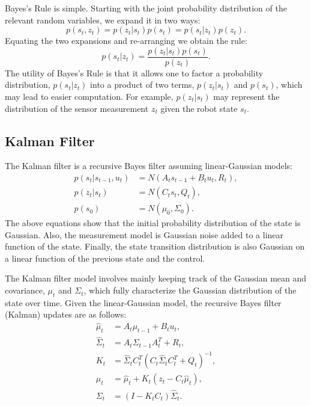 \documentclass{article}
\begin{document}
Bayes's Rule is simple.  Starting with the joint probability distribution of the relevant random variables, we expand it in two ways:
\begin{equation}
p(s_t , z_t) = p(z_t | s_t) p(s_t) = p(s_t | z_t) p(z_t).
\end{equation}
Equating the two expansions and re-arranging we obtain the rule:
\begin{equation}
p(s_t | z_t) = \frac{p(z_t | s_t) p(s_t)}{p(z_t)}.
\end{equation}
The utility of Bayes's Rule is that it allows one to factor a probability distribution, $p(s_t | z_t)$ into a product of two terms, $p(z_t | s_t)$ and $p(s_t)$, which may lead to easier computation.  For example, $p(z_t | s_t)$ may represent the distribution of the sensor measurement $z_t$ given the robot state $s_t$.

\subsection{Kalman Filter} \label{sec:kalman}

The Kalman filter is a recursive Bayes filter assuming linear-Gaussian models:
\begin{align}
p(s_t | s_{t-1}, u_t) &= N(A_t s_{t-1} + B_t u_t, R_t), \\
p(z_t | s_t) &= N(C_t s_t,  Q_t), \\
p(s_0) &= N(\mu_0, \Sigma_0).
\end{align}
The above equations show that the initial probability distribution of the state is Gaussian.  Also, the measurement model is Gaussian noise added to a linear function of the state.  Finally, the state transition distribution is also Gaussian on a linear function of the previous state and the control.

The Kalman filter model involves mainly keeping track of the Gaussian mean and covariance, $\mu_t$ and $\Sigma_t$, which fully characterize the Gaussian distribution of the state over time.  Given the linear-Gaussian model, the recursive Bayes filter (Kalman) updates are as follows:
\begin{align}
\hat{\mu}_t &= A_t \mu_{t-1} + B_t u_t, \\
\hat{\Sigma}_t &= A_t \Sigma_{t-1} A_t^T + R_t, \\
K_t &= \hat{\Sigma}_t C_t^T (C_t \hat{\Sigma}_t C_t^T + Q_t)^{-1}, \\
\mu_t &= \hat{\mu}_t + K_t (z_t - C_t \hat{\mu}_t), \\
\Sigma_t &= (I - K_t C_t) \hat{\Sigma}_t.
\end{align}
\end{document}
